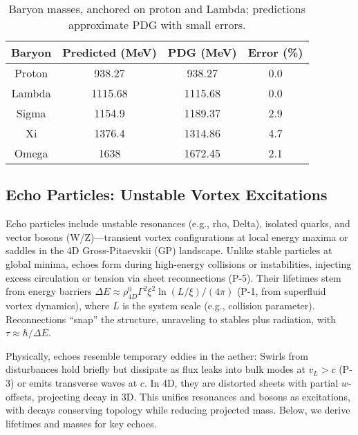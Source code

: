 \begin{table}[h!]
\centering
\begin{tabular}{|c|c|c|c|}
\hline
Baryon & Predicted (MeV) & PDG (MeV) & Error (\%) \\
\hline
Proton & 938.27 & 938.27 & 0.0 \\
Lambda & 1115.68 & 1115.68 & 0.0 \\
Sigma & 1154.9 & 1189.37 & 2.9 \\
Xi & 1376.4 & 1314.86 & 4.7 \\
Omega & 1638 & 1672.45 & 2.1 \\
\hline
\end{tabular}
\caption{Baryon masses, anchored on proton and Lambda; predictions approximate PDG with small errors.}
\label{tab:baryons}
\end{table}


\subsection{Echo Particles: Unstable Vortex Excitations}

Echo particles include unstable resonances (e.g., rho, Delta), isolated quarks, and vector bosons (W/Z)—transient vortex configurations at local energy maxima or saddles in the 4D Gross-Pitaevskii (GP) landscape. Unlike stable particles at global minima, echoes form during high-energy collisions or instabilities, injecting excess circulation or tension via sheet reconnections (P-5). Their lifetimes stem from energy barriers $\Delta E \approx \rho_{4D}^0 \Gamma^2 \xi^2 \ln(L / \xi) / (4\pi)$ (P-1, from superfluid vortex dynamics), where $L$ is the system scale (e.g., collision parameter). Reconnections ``snap'' the structure, unraveling to stables plus radiation, with $\tau \approx \hbar / \Delta E$.

Physically, echoes resemble temporary eddies in the aether: Swirls from disturbances hold briefly but dissipate as flux leaks into bulk modes at $v_L > c$ (P-3) or emits transverse waves at $c$. In 4D, they are distorted sheets with partial $w$-offsets, projecting decay in 3D. This unifies resonances and bosons as excitations, with decays conserving topology while reducing projected mass. Below, we derive lifetimes and masses for key echoes.

